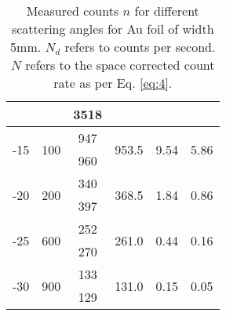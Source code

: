 \begin{table}[]
\begin{tabular}{|c|c|c|c|c|c|}
     &  & 3518 &  &  &  \\ \hline
    \multirow{2}{*}{-15} & \multirow{2}{*}{100} & 947 & \multirow{2}{*}{953.5} & \multirow{2}{*}{9.54} & \multirow{2}{*}{5.86} \\ \cline{3-3}
     &  & 960 &  &  &  \\ \hline
    \multirow{2}{*}{-20} & \multirow{2}{*}{200} & 340 & \multirow{2}{*}{368.5} & \multirow{2}{*}{1.84} & \multirow{2}{*}{0.86} \\ \cline{3-3}
     &  & 397 &  &  &  \\ \hline
    \multirow{2}{*}{-25} & \multirow{2}{*}{600} & 252 & \multirow{2}{*}{261.0} & \multirow{2}{*}{0.44} & \multirow{2}{*}{0.16} \\ \cline{3-3}
     &  & 270 &  &  &  \\ \hline
    \multirow{2}{*}{-30} & \multirow{2}{*}{900} & 133 & \multirow{2}{*}{131.0} & \multirow{2}{*}{0.15} & \multirow{2}{*}{0.05} \\ \cline{3-3}
     &  & 129 &  &  &  \\ \hline
    \end{tabular}
    \caption{Measured counts $n$ for different scattering angles for Au foil of width 5mm. $N_d$ refers to counts per second. $N$ refers to the space corrected count rate as per Eq. \ref{eq:4}.}
    \label{tab}
    \end{table}